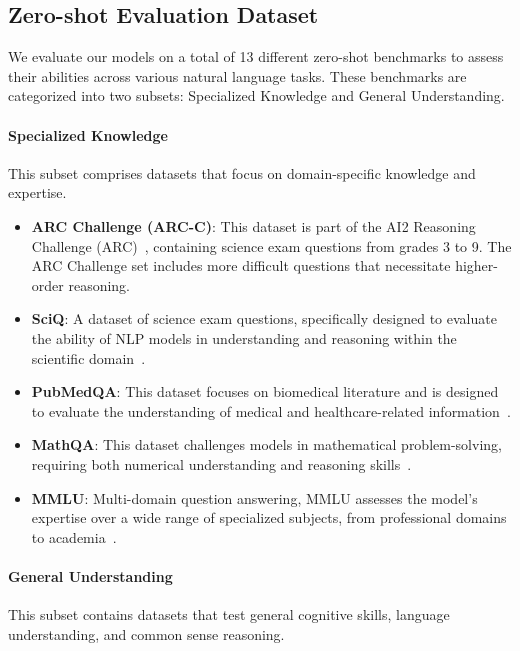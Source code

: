\documentclass[table]{article}
\begin{document}
\subsection{Zero-shot Evaluation Dataset}
We evaluate our models on a total of 13 different zero-shot benchmarks to assess their abilities across various natural language tasks. These benchmarks are categorized into two subsets: Specialized Knowledge and General Understanding.

\paragraph{Specialized Knowledge}
This subset comprises datasets that focus on domain-specific knowledge and expertise.

\begin{itemize}
\item \textbf{ARC Challenge (ARC-C)}: This dataset is part of the AI2 Reasoning Challenge (ARC)~\citep{allenai:arc}, containing science exam questions from grades 3 to 9. The ARC Challenge set includes more difficult questions that necessitate higher-order reasoning.
\item \textbf{SciQ}: A dataset of science exam questions, specifically designed to evaluate the ability of NLP models in understanding and reasoning within the scientific domain~\citep{SciQ}.
\item \textbf{PubMedQA}: This dataset focuses on biomedical literature and is designed to evaluate the understanding of medical and healthcare-related information~\citep{jin2019pubmedqa}.
\item \textbf{MathQA}: This dataset challenges models in mathematical problem-solving, requiring both numerical understanding and reasoning skills~\citep{amini-etal-2019-mathqa}.
\item \textbf{MMLU}: Multi-domain question answering, MMLU assesses the model's expertise over a wide range of specialized subjects, from professional domains to academia~\citep{hendryckstest2021}.
\end{itemize}

\paragraph{General Understanding}
This subset contains datasets that test general cognitive skills, language understanding, and common sense reasoning.
\end{document}
